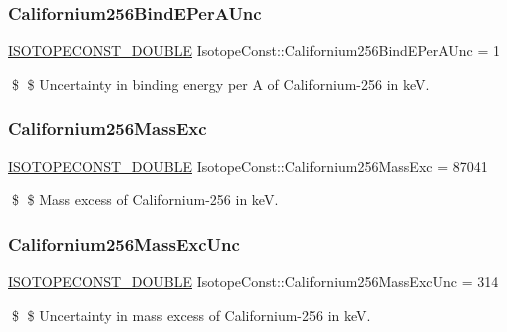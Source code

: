 \subsubsection{\texorpdfstring{Californium256\+Bind\+E\+Per\+A\+Unc}{Californium256BindEPerAUnc}}
{\footnotesize\ttfamily \mbox{\hyperlink{group___isotope_const-_macros_ga8f45a7272ce02c0b4c65c44636ed719a}{I\+S\+O\+T\+O\+P\+E\+C\+O\+N\+S\+T\+\_\+\+D\+O\+U\+B\+LE}} Isotope\+Const\+::\+Californium256\+Bind\+E\+Per\+A\+Unc = 1}

\$ \$ Uncertainty in binding energy per A of Californium-\/256 in keV. \mbox{\label{group___isotope_const-_californium-_cf256_gaa630565f9267a0e96064279c54499c0c}} 
\subsubsection{\texorpdfstring{Californium256\+Mass\+Exc}{Californium256MassExc}}
{\footnotesize\ttfamily \mbox{\hyperlink{group___isotope_const-_macros_ga8f45a7272ce02c0b4c65c44636ed719a}{I\+S\+O\+T\+O\+P\+E\+C\+O\+N\+S\+T\+\_\+\+D\+O\+U\+B\+LE}} Isotope\+Const\+::\+Californium256\+Mass\+Exc = 87041}

\$ \$ Mass excess of Californium-\/256 in keV. \mbox{\label{group___isotope_const-_californium-_cf256_gae105a396bc8cb4dc9a4ada62b04a8119}} 
\subsubsection{\texorpdfstring{Californium256\+Mass\+Exc\+Unc}{Californium256MassExcUnc}}
{\footnotesize\ttfamily \mbox{\hyperlink{group___isotope_const-_macros_ga8f45a7272ce02c0b4c65c44636ed719a}{I\+S\+O\+T\+O\+P\+E\+C\+O\+N\+S\+T\+\_\+\+D\+O\+U\+B\+LE}} Isotope\+Const\+::\+Californium256\+Mass\+Exc\+Unc = 314}

\$ \$ Uncertainty in mass excess of Californium-\/256 in keV. \mbox{\label{group___isotope_const-_californium-_cf256_gae6204b529a404a3d800691d3c79f3e51}} 
